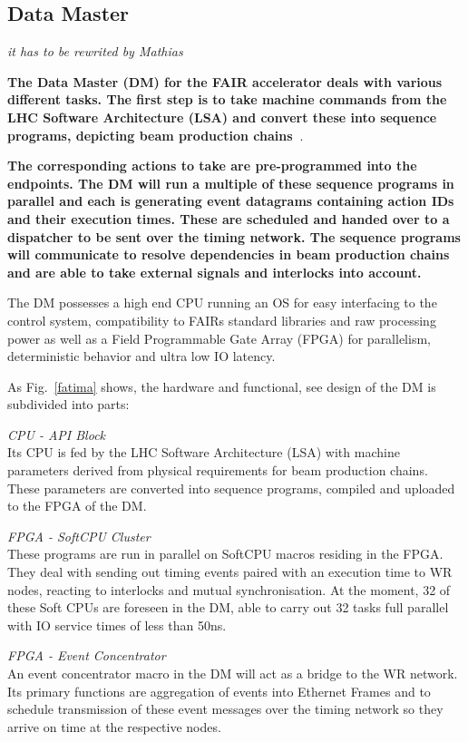 \subsection{Data Master}
\textit{ it has to be rewrited by Mathias}

\textbf{The Data Master (DM) for the FAIR accelerator deals with various different tasks.
The first step is to take machine commands from the LHC Software
Architecture (LSA) and convert these into sequence programs,
depicting beam production chains~\cite{dm}}.

\textbf{The corresponding actions to take are pre-programmed into the endpoints.
The DM will run a multiple of these sequence programs
in parallel and each is generating event datagrams containing action IDs
and their execution times. These are scheduled and handed over to a dispatcher
to be sent over the timing network. The sequence programs will communicate to
resolve dependencies in beam production chains and are able to take external
signals and interlocks into account.}


The DM possesses a high end CPU running an
OS for easy interfacing to the control system, compatibility to 
FAIRs standard libraries and raw processing power as well as a 
Field Programmable Gate Array (FPGA) for parallelism, deterministic 
behavior and ultra low IO latency.

As Fig.~\ref{fatima} shows, the hardware and functional, see design of the DM is subdivided into
parts:

\textit{CPU - API Block} \\
Its CPU is fed by the LHC Software
Architecture (LSA) with machine parameters derived from
physical requirements for beam production chains. These
parameters are converted into sequence programs,
compiled and uploaded to the FPGA of the DM.

\textit{FPGA - SoftCPU Cluster} \\
These programs are run in
parallel on SoftCPU macros residing in the FPGA. They
deal with sending out timing events paired with an execution time to WR nodes, 
reacting to interlocks and mutual synchronisation. At the moment, 32 of these Soft CPUs are
foreseen in the DM, able to carry out 32 tasks full parallel with IO service times of less than 50ns.

\textit{FPGA - Event Concentrator} \\
An event concentrator macro in the DM will act as a bridge to the WR
network. Its primary functions are aggregation of events
into Ethernet Frames and to schedule transmission of these
event messages over the timing network so they arrive on
time at the respective nodes. 

